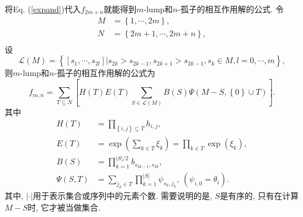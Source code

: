 \documentclass[12pt,a4paper,UTF8]{article}
\numberwithin{equation}{section}
\newcommand{\sbrace}[1]{\left(#1\right)}
\newcommand{\mbrace}[1]{\left[#1\right]}
\newcommand{\bbrace}[1]{\left\{#1\right\}}
\newcommand{\refeqn}[1]{Eq. (\ref{#1})}
\newcommand{\MLNS}{$m$-lump和$n$-孤子的相互作用解}
\begin{document}
将\refeqn{expand}代入$f_{2m+n}$就能得到\MLNS{}的公式. 令
\begin{equation}
\begin{aligned}
M&=\bbrace{1,\cdots,2m}, \\ 
N&=\bbrace{2m+1,\cdots,2m+n}, \\ 
\end{aligned}
\end{equation}
设
\begin{equation}
\mathcal{L}(M)=\bbrace{\mbrace{s_1,\cdots,s_{2l}}|s_{2k}>s_{2k-1},s_{2k+1}>s_{2k-1},s_k\in M,l=0,\cdots,m} , 
\end{equation}
则\MLNS{}的公式为
\begin{equation}
f_{m,n}=\sum_{T\subseteq N}\mbrace{H(T)E(T)\sum_{S\in \mathcal L(M)}{B(S)\Psi(M-S,\bbrace{0}\cup T)}}.
\label{fmn}
\end{equation}
其中 
\begin{equation}
\begin{aligned}
H(T)&=\prod_{\bbrace{i,j}\subseteq T}{h_{i,j}}, \\ 
E(T)&=\exp\sbrace{\sum_{k\in T}{\xi_k}}=\prod_{k\in T}\exp(\xi_k), \\ 
B(S)&=\prod_{k=1}^{|S|/2}{b_{s_{2k-1},s_{2k}}},\\ 
\Psi(S,T)&=\sum_{j_k\in T}{\prod_{k=1}^{|S|}{\psi_{s_k,j_k}}}, ~(\psi_{i,0}=\theta_i). 
\end{aligned}
\end{equation}
其中, $|\cdot|$用于表示集合或序列中的元素个数. 需要说明的是, $S$是有序的, 只有在计算$M-S$时, 它才被当做集合. 
\end{document}
